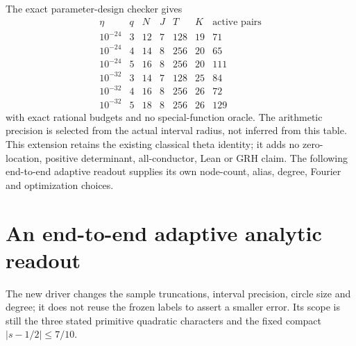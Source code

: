 \documentclass[11pt]{article}
\theoremstyle{definition}\newtheorem{definition}[theorem]{Definition}
\theoremstyle{remark}\newtheorem{remark}[theorem]{Remark}
\begin{document}
The exact parameter-design checker gives
\[
\begin{array}{c|c|rrrr|r}
\eta&q&N&J&T&K&\text{active pairs}\\\hline
10^{-24}&3&12&7&128&19&71\\
10^{-24}&4&14&8&256&20&65\\
10^{-24}&5&16&8&256&20&111\\
10^{-32}&3&14&7&128&25&84\\
10^{-32}&4&16&8&256&26&72\\
10^{-32}&5&18&8&256&26&129
\end{array}
\]
with exact rational budgets and no special-function oracle.
The arithmetic precision is selected from the actual interval radius,
not inferred from this table. This extension retains the existing
classical theta identity; it adds no zero-location, positive determinant,
all-conductor, Lean or GRH claim. The following end-to-end adaptive readout supplies its own node-count,
alias, degree, Fourier and optimization choices.

\section{An end-to-end adaptive analytic readout}\label{at:family}
The new driver changes the sample truncations, interval precision, circle
size and degree; it does not reuse the frozen labels to assert a smaller
error. Its scope is still the three stated primitive quadratic characters
and the fixed compact $|s-1/2|\le7/10$.
\end{document}
